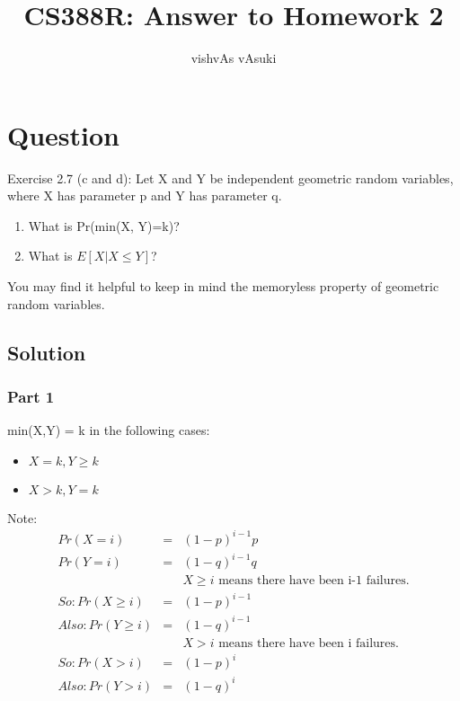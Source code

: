\documentclass[10pt]{article}
\title{CS388R: Answer to Homework 2}
\author{vishvAs vAsuki}
\begin{document}
\maketitle

\section{Question}

Exercise 2.7 (c and d): Let X and Y be independent geometric random variables, where X has parameter p and Y has parameter q.

\begin{enumerate}

\item       What is Pr(min(X, Y)=k)?
\item       What is $E[X|X\leq Y]$?
\end{enumerate}

You may find it helpful to keep in mind the memoryless property of geometric random variables.

\subsection{Solution}

\subsubsection*{Part 1}

min(X,Y) = k in the following cases:

\begin{itemize}
\item $X=k, Y \geq k$
\item $X>k, Y=k$
\end{itemize}

Note:
\begin{eqnarray}
Pr(X = i) &=& (1-p)^{i-1}p\\
Pr(Y = i) &=& (1-q)^{i-1}q\\
&&\text{$X \geq i$ means there have been i-1 failures.}\\
So: Pr(X \geq i) &=& (1-p)^{i-1}\\
Also: Pr(Y \geq i) &=& (1-q)^{i-1}\\
&&\text{$X > i$ means there have been i failures.}\\
So: Pr(X > i) &=& (1-p)^{i}\\
Also: Pr(Y > i) &=& (1-q)^{i}\\
\end{eqnarray}
\end{document}
